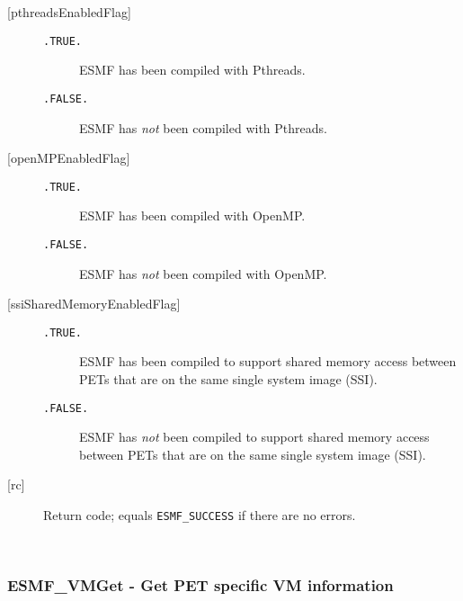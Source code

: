 \begin{description}
     \item[{[pthreadsEnabledFlag]}]
          \begin{description}
          \item[{\tt .TRUE.}]
               ESMF has been compiled with Pthreads.
          \item[{\tt .FALSE.}]
               ESMF has {\em not} been compiled with Pthreads.
          \end{description}
     \item[{[openMPEnabledFlag]}]
          \begin{description}
          \item[{\tt .TRUE.}]
               ESMF has been compiled with OpenMP.
          \item[{\tt .FALSE.}]
               ESMF has {\em not} been compiled with OpenMP.
          \end{description}
     \item[{[ssiSharedMemoryEnabledFlag]}]
          \begin{description}
          \item[{\tt .TRUE.}]
               ESMF has been compiled to support shared memory access
               between PETs that are on the same single system image (SSI).
          \item[{\tt .FALSE.}]
               ESMF has {\em not} been compiled to support shared memory access
               between PETs that are on the same single system image (SSI).
          \end{description}
     \item[{[rc]}] 
          Return code; equals {\tt ESMF\_SUCCESS} if there are no errors.
     \end{description}
   
 
\mbox{}\hrulefill\ 
 
\subsubsection [ESMF\_VMGet] {ESMF\_VMGet - Get PET specific VM information}


